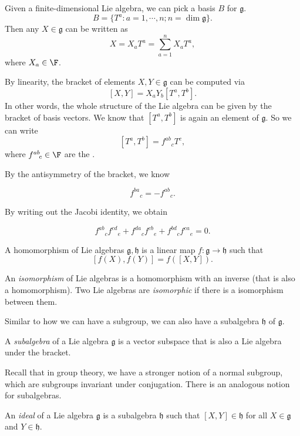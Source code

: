 \documentclass[a4paper]{article}
\begin{document}
Given a finite-dimensional Lie algebra, we can pick a basis $B$ for $\mathfrak{g}$.
\[
  B = \{T^a: a = 1, \cdots, n; n = \dim \mathfrak{g}\}.
\]
Then any $X \in \mathfrak{g}$ can be written as
\[
  X = X_a T^a = \sum_{a = 1}^n X_a T^a,
\]
where $X_a \in \F$.

By linearity, the bracket of elements $X, Y \in \mathfrak{g}$ can be computed via
\[
  [X, Y] = X_a Y_b [T^a, T^b].
\]
In other words, the whole structure of the Lie algebra can be given by the bracket of basis vectors. We know that $[T^a, T^b]$ is again an element of $\mathfrak{g}$. So we can write
\[
  [T^a, T^b] = f^{ab}\!_c T^c,
\]
where $f^{ab}\!_c\in \F$ are the .

By the antisymmetry of the bracket, we know
\begin{prop}
  \[
    f^{ba}\!_c = -f^{ab}\!_c.
  \]
\end{prop}

By writing out the Jacobi identity, we obtain
\begin{prop}
  \[
    f^{ab}\!_c f^{cd}\!_e + f^{da}\!_c f^{cb}\!_e + f^{bd}\!_c f^{ca}\!_e = 0.
  \]
\end{prop}

\begin{defi}
  A homomorphism of Lie algebras $\mathfrak{g}, \mathfrak{h}$ is a linear map $f: \mathfrak{g} \to \mathfrak{h}$ such that
  \[
    [f(X), f(Y)] = f([X, Y]).
  \]
\end{defi}

\begin{defi}
  An \emph{isomorphism} of Lie algebras is a homomorphism with an inverse (that is also a homomorphism). Two Lie algebras are \emph{isomorphic} if there is a isomorphism between them.
\end{defi}

Similar to how we can have a subgroup, we can also have a subalgebra $\mathfrak{h}$ of $\mathfrak{g}$.

\begin{defi}[Subalgebra]
  A \emph{subalgebra} of a Lie algebra $\mathfrak{g}$ is a vector subspace that is also a Lie algebra under the bracket.
\end{defi}

Recall that in group theory, we have a stronger notion of a normal subgroup, which are subgroups invariant under conjugation. There is an analogous notion for subalgebras.
\begin{defi}[Ideal]
  An \emph{ideal} of a Lie algebra $\mathfrak{g}$ is a subalgebra $\mathfrak{h}$ such that $[X, Y] \in \mathfrak{h}$ for all $X \in \mathfrak{g}$ and $Y \in \mathfrak{h}$.
\end{defi}
\end{document}
